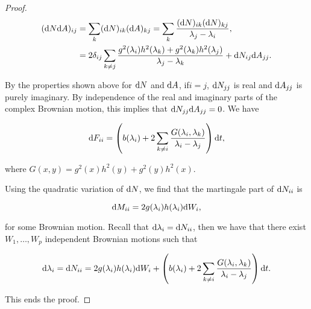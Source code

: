 \begin{proof}
    \begin{align*}
        (\mathrm d N\mathrm d A)_{ij} &= \sum_{k} (\mathrm d N)_{ik}(\mathrm d A)_{kj} = \sum_k \frac{(\mathrm d N)_{ik}(\mathrm d N)_{kj}}{\lambda_j - \lambda_i}, \\
        &= 2\delta_{ij}\sum_{k\neq j} \frac{ g^2(\lambda_i)h^2(\lambda_k) + g^2(\lambda_k)h^2(\lambda_j)}{\lambda_j - \lambda_k} + \mathrm d N_{ij}\mathrm d A_{jj}.
    \end{align*}

    By the properties shown above for $\mathrm d N$ and $\mathrm d A$, if$i=j$, $\mathrm d N_{jj}$ is real and $\mathrm d A_{jj}$ is purely imaginary. By independence of the real and imaginary parts of the complex Brownian motion, this implies that $\mathrm d N_{jj}\mathrm d A_{jj}=0$. We have

    \begin{equation*}
        \mathrm d F_{ii} = \left(b(\lambda_i) + 2 \sum_{k\neq i} \frac{G(\lambda_i,\lambda_k)}{\lambda_i - \lambda_j}\right)\mathrm d t,
    \end{equation*}

    \noindent where $G(x,y)=g^2(x)h^2(y) + g^2(y)h^2(x)$.

    Using the quadratic variation of $\mathrm d N$, we find that the martingale part of $\mathrm d N_{ii}$ is 

    \begin{equation*}
        \mathrm d M_{ii} = 2g(\lambda_i)h(\lambda_i)\mathrm d W_i,
    \end{equation*}

    \noindent for some Brownian motion. Recall that $\mathrm d \lambda_i = \mathrm d N_{ii}$, then we have that there exist $W_1,\dots,W_p$ independent Brownian motions such that

    \begin{equation*}
        \mathrm d \lambda_i = \mathrm d N_{ii} = 2g(\lambda_i)h(\lambda_i)\mathrm d W_i + \left(b(\lambda_i) + 2 \sum_{k\neq i} \frac{G(\lambda_i,\lambda_k)}{\lambda_i - \lambda_j}\right)\mathrm d t.
    \end{equation*}

    This ends the proof.
\end{proof}


